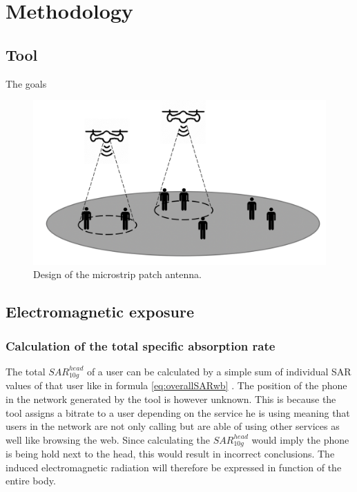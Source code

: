 \chapter{Methodology}
\label{chap:methodology}


\section{Tool}
The goals 
\begin{figure}[h!]
\centering
  \includegraphics[width=\textwidth]{../images/generalIdeaIllustration.png}
  \caption{Design of the microstrip patch antenna.}
  \label{fig:antennadesign}
\end{figure}


\section{Electromagnetic exposure}
\subsection{Calculation of the total specific absorption rate} %
\label{sub:Calculationexposure}

The total $SAR^{head}_{10g}$ of a user can be calculated by a simple sum of individual SAR values of that user like in formula \ref{eq:overallSARwb} \cite{J17_kuehn2019modelling}. 
The position of the phone in the network generated by the tool is however unknown. This is because the tool assigns a bitrate 
to a user depending on the service he is using
meaning that users in the network are not only calling but are able of using other services as well like browsing the web. 
Since calculating the $SAR^{head}_{10g}$ would imply the phone is being hold next to the head, this would result in incorrect conclusions.
The induced electromagnetic radiation will therefore be expressed in function of the entire body.


